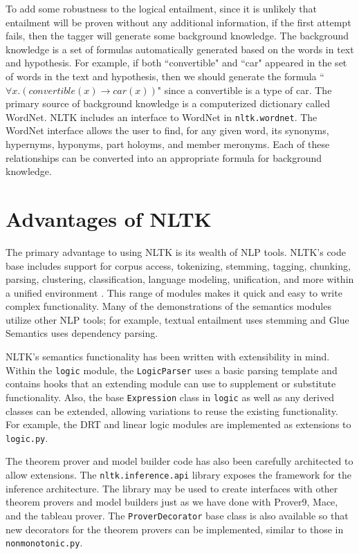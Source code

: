 \documentclass[11pt]{article}
\newcommand{\dhgcode}[1]{{\tt #1}}
\begin{document}
To add some robustness to the logical entailment, since it is unlikely that entailment will be proven without any additional information, if the first attempt fails, then the tagger will generate some background knowledge.  The background knowledge is a set of formulas automatically generated based on the words in text and hypothesis.  For example, if both ``convertible" and ``car" appeared in the set of words in the text and hypothesis, then we should generate the formula ``$\forall x.(convertible(x) \rightarrow car(x))$" since a convertible is a type of car.  The primary source of background knowledge is a computerized dictionary called WordNet.  NLTK includes an interface to WordNet in \dhgcode{nltk.wordnet}.  The WordNet interface allows the user to find, for any given word, its synonyms, hypernyms, hyponyms, part holoyms, and member meronyms.  Each of these relationships can be converted into an appropriate formula for background knowledge.


\section{Advantages of NLTK}
The primary advantage to using NLTK is its wealth of NLP tools.  NLTK's code base includes support for corpus access, tokenizing, stemming, tagging, chunking, parsing, clustering, classification, language modeling, unification, and more within a unified environment \cite{Multidisciplinary}.  This range of modules makes it quick and easy to write complex functionality.  Many of the demonstrations of the semantics modules utilize other NLP tools; for example, textual entailment uses stemming and Glue Semantics uses dependency parsing.

NLTK's semantics functionality has been written with extensibility in mind.  Within the \dhgcode{logic} module, the \dhgcode{LogicParser} uses a basic parsing template and contains hooks that an extending module can use to supplement or substitute functionality.  Also, the base \dhgcode{Expression} class in \dhgcode{logic} as well as any derived classes can be extended, allowing variations to reuse the existing functionality.  For example, the DRT and linear logic modules are implemented as extensions to \dhgcode{logic.py}.  

The theorem prover and model builder code has also been carefully architected to allow extensions.  The \dhgcode{nltk.inference.api} library exposes the framework for the inference architecture.  The library may be used to create interfaces with other theorem provers and model builders just as we have done with Prover9, Mace, and the tableau prover.  The \dhgcode{ProverDecorator} base class is also available so that new decorators for the theorem provers can be implemented, similar to those in \dhgcode{nonmonotonic.py}.  
\end{document}

